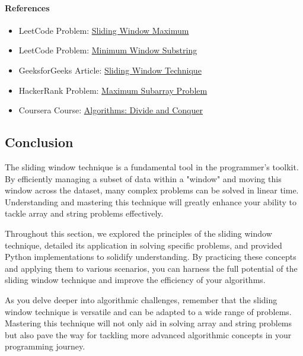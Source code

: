 \paragraph*{References}

\begin{itemize}
    \item LeetCode Problem: \href{https://leetcode.com/problems/sliding-window-maximum/}{Sliding Window Maximum}
    \item LeetCode Problem: \href{https://leetcode.com/problems/minimum-window-substring/}{Minimum Window Substring}
    \item GeeksforGeeks Article: \href{https://www.geeksforgeeks.org/sliding-window-technique/}{Sliding Window Technique}
    \item HackerRank Problem: \href{https://www.hackerrank.com/challenges/maximum-subarray/problem}{Maximum Subarray Problem}
    \item Coursera Course: \href{https://www.coursera.org/learn/algorithms-divide-conquer}{Algorithms: Divide and Conquer}
\end{itemize}

\subsection*{Conclusion}

The sliding window technique is a fundamental tool in the programmer's toolkit. By efficiently managing a subset of data within a "window" and moving this window across the dataset, many complex problems can be solved in linear time. Understanding and mastering this technique will greatly enhance your ability to tackle array and string problems effectively.

Throughout this section, we explored the principles of the sliding window technique, detailed its application in solving specific problems, and provided Python implementations to solidify understanding. By practicing these concepts and applying them to various scenarios, you can harness the full potential of the sliding window technique and improve the efficiency of your algorithms.

As you delve deeper into algorithmic challenges, remember that the sliding window technique is versatile and can be adapted to a wide range of problems. Mastering this technique will not only aid in solving array and string problems but also pave the way for tackling more advanced algorithmic concepts in your programming journey.